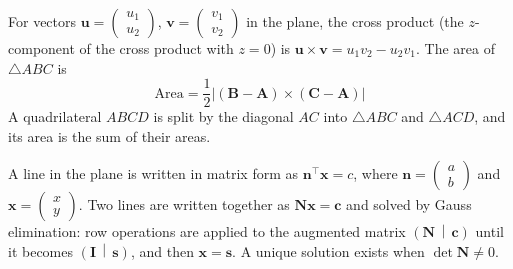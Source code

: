 \item For vectors $\mathbf{u} = \begin{pmatrix} u_1 \\ u_2 \end{pmatrix}$, $\mathbf{v} = \begin{pmatrix} v_1 \\ v_2 \end{pmatrix}$ in the plane, the cross product (the $z$-component of the cross product with $z = 0$) is $\mathbf{u}\times\mathbf{v} = u_1v_2 - u_2v_1$. The area of $\triangle ABC$ is
\begin{equation}
\text{Area} = \frac{1}{2}\left|\left(\mathbf{B}-\mathbf{A}\right)\times\left(\mathbf{C}-\mathbf{A}\right)\right|
\label{c10eq:crossarea}
\end{equation}
A quadrilateral $ABCD$ is split by the diagonal $AC$ into $\triangle ABC$ and $\triangle ACD$, and its area is the sum of their areas.

\item A line in the plane is written in matrix form as $\mathbf{n}^{\top}\mathbf{x} = c$, where $\mathbf{n} = \begin{pmatrix} a \\ b \end{pmatrix}$ and $\mathbf{x} = \begin{pmatrix} x \\ y \end{pmatrix}$. Two lines are written together as $\mathbf{N}\mathbf{x} = \mathbf{c}$ and solved by Gauss elimination: row operations are applied to the augmented matrix $\left(\mathbf{N} \,\middle|\, \mathbf{c}\right)$ until it becomes $\left(\mathbf{I} \,\middle|\, \mathbf{s}\right)$, and then $\mathbf{x} = \mathbf{s}$. A unique solution exists when $\det\mathbf{N} \ne 0$.

